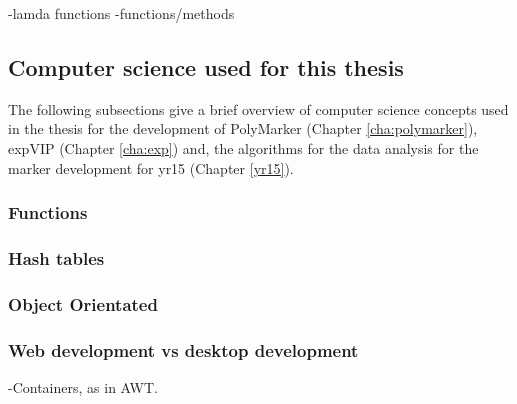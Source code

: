 -lamda functions
-functions/methods

\subsection{Computer science used for this thesis}

The following subsections give a brief overview of computer science concepts used in the thesis for the development of PolyMarker (Chapter \ref{cha:polymarker}), expVIP (Chapter \ref{cha:exp}) and, the algorithms for the data analysis for the marker development for \acrshort{yr15} (Chapter \ref{yr15}).  

\subsubsection{Functions}

\subsubsection{Hash tables}

\subsubsection{Object Orientated}

\subsubsection{Web development vs desktop development}










-Containers, as in AWT. 

 \label{lit:patterns}
